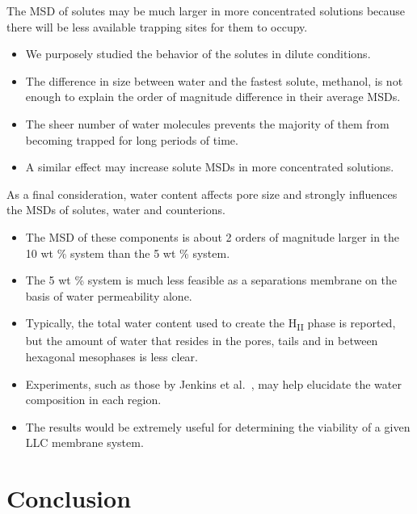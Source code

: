 \documentclass{article}
\begin{document}
  The MSD of solutes may be much larger in more concentrated solutions because there
  will be less available trapping sites for them to occupy.

  \begin{itemize}
    \item We purposely studied the behavior of the solutes in dilute conditions.
    \item The difference in size between water and the fastest solute, methanol, is not
    enough to explain the order of magnitude difference in their average MSDs.
    \item The sheer number of water molecules prevents the majority of them from 
    becoming trapped for long periods of time.
    \item A similar effect may increase solute MSDs in more concentrated solutions.
  \end{itemize}
  
  As a final consideration, water content affects pore size and strongly influences
  the MSDs of solutes, water and counterions.
  \begin{itemize}
    \item The MSD of these components is about 2 orders of magnitude larger in the 
    10 wt \% system than the 5 wt \% system.
    \item The 5 wt \% system is much less feasible as a separations membrane on the basis
    of water permeability alone.
    \item Typically, the total water content used to create the H\textsubscript{II} phase
    is reported, but the amount of water that resides in the pores, tails and in between
    hexagonal mesophases is less clear.
    \item Experiments, such as those by Jenkins et al.~\cite{jenkins_identification_2012}, 
    may help elucidate the water composition in each region.
    \item The results would be extremely useful for determining the viability of a given
    LLC membrane system. 
  \end{itemize}

  \section{Conclusion}
\end{document}
